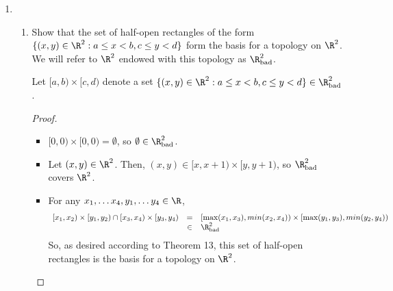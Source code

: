 \documentclass[letterpaper]{article}
\newcommand{\Rbad}{\R_\text{bad}}
\begin{document}
\begin{enumerate}
\begin{enumerate}
\begin{proof}
	Now we will show that ${\Rbad^1}_\Q\neq \Rbad^1$. Consider the set $[\pi, 5)$. By definition, $[\pi, 5)$ is open in $\Rbad^1$. Now, $[\pi, 5)$ is not itself a basic open set in ${\Rbad^1}_\Q$, nor is it a union of basic sets in ${\Rbad^1}_\Q$, since any union of rational intervals $[a,b)$ must either disclude $\pi$, or include reals which are less than $\pi$. 
	\end{proof}
	\end{enumerate}

\item 
	\begin{enumerate}
	\item Show that the set of half-open rectangles of the form $\{(x, y) \in \R^2: a \leq x < b, c \leq y < d\}$ form the basis for a topology on $\R^2$. We will refer to $\R^2$ endowed with this topology as $\Rbad^2$.
	\begin{notation*}
	Let $[a,b)\times[c,d)$ denote a set $\{(x, y) \in \R^2: a \leq x < b, c \leq y < d\} \in \Rbad^2$.
	\end{notation*}
	\begin{proof}\mbox{}
	\begin{itemize}
	\item $[0,0)\times[0,0)=\emptyset$, so $\emptyset\in \Rbad^2$.
	\item Let $(x,y)\in \R^2$. Then, $(x,y)\in[x,x+1)\times[y,y+1)$, so $\Rbad^2$ covers $\R^2$. 
	\item For any $x_1, \ldots x_4, y_1, \ldots y_4 \in\R$, 
		\[
		\begin{array}{rcll}
		[x_1,x_2)\times[y_1,y_2)\cap[x_3,x_4)\times[y_3,y_4)&=& [\max(x_1,x_3),min(x_2,x_4))\times[\max(y_1,y_3),min(y_2,y_4))\\
		&\in& \Rbad^2\\
		\end{array}
		\]
		So, as desired according to Theorem 13, this set of half-open rectangles is the basis for a topology on $\R^2$. \qedhere
	\end{itemize}
	\end{proof}
	

\end{enumerate}
\end{enumerate}
\end{document}
